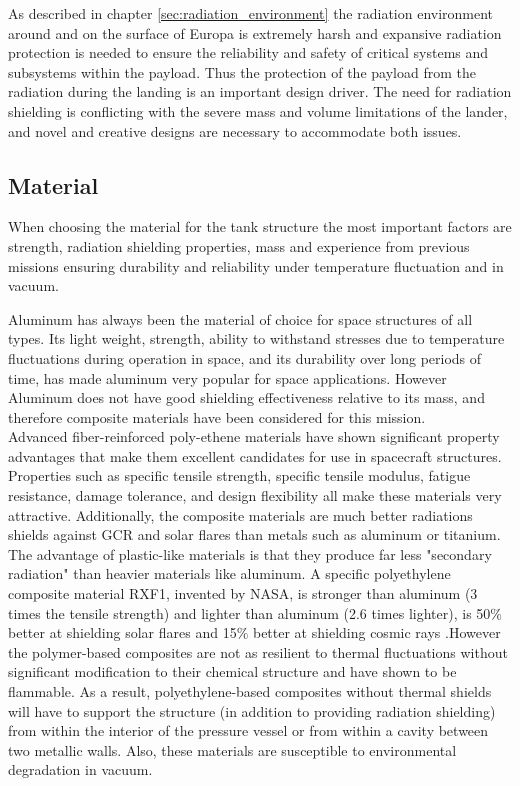 \label{chap:radedl}

As described in chapter \ref{sec:radiation_environment} the radiation environment around and on the surface of Europa is extremely harsh and expansive radiation protection is needed to ensure the reliability and safety of critical systems and subsystems within the payload. Thus the protection of the payload from the radiation during the landing is an important design driver. The need for radiation shielding is conflicting with the severe mass and volume limitations of the lander, and novel and creative designs are necessary to accommodate both issues.

\subsection{Material}

When choosing the material for the tank structure the most important factors are strength, radiation shielding properties, mass and experience from previous missions ensuring durability and reliability under temperature fluctuation and in vacuum. 

Aluminum has always been the material of choice for space structures of all types. Its light weight, strength, ability to withstand stresses due to temperature fluctuations during operation in space, and its durability over long periods of time, has made aluminum very popular for space applications. However Aluminum does not have good shielding effectiveness relative to its mass, and therefore composite materials have been considered for this mission.\\

\noindent
Advanced fiber-reinforced poly-ethene materials have shown significant property advantages that make them excellent candidates for use in spacecraft structures. Properties such as specific tensile strength, specific tensile modulus, fatigue resistance, damage tolerance, and design flexibility all make these materials very attractive. Additionally, the composite materials are much better radiations shields against GCR and solar flares than metals such as aluminum or titanium. The advantage of plastic-like materials is that they produce far less "secondary radiation" than heavier materials like aluminum. A specific polyethylene composite material RXF1, invented by NASA, is stronger than aluminum (3 times the tensile strength) and lighter than aluminum (2.6 times lighter), is 50$\%$ better at shielding solar flares and 15$\%$ better at shielding cosmic rays \cite{RXF1}.However the polymer-based composites are not as resilient to thermal fluctuations without significant modification to their chemical structure and have shown to be flammable. As a result, polyethylene-based composites without thermal shields will have to support the structure (in addition to providing radiation shielding) from within the interior of the pressure vessel or from within a cavity between two metallic walls. Also, these materials are susceptible to environmental degradation in vacuum. \\
 

